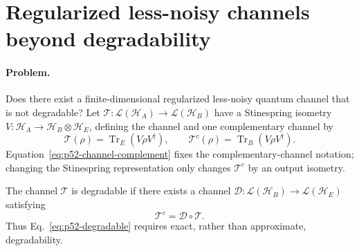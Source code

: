 \section{Regularized less-noisy channels beyond degradability}
\label{sec:problem-52}

\paragraph{Problem.}
Does there exist a finite-dimensional regularized less-noisy quantum channel
that is not degradable?  Let
$\mathcal T:\mathcal L(\mathcal H_A)\to\mathcal L(\mathcal H_B)$ have a
Stinespring isometry
$V:\mathcal H_A\to\mathcal H_B\otimes\mathcal H_E$, defining the channel and
one complementary channel by
\begin{equation}
  \mathcal T(\rho)=\operatorname{Tr}_E(V\rho V^\dagger),
  \qquad
  \mathcal T^c(\rho)=\operatorname{Tr}_B(V\rho V^\dagger).
  \label{eq:p52-channel-complement}
\end{equation}
Equation~\eqref{eq:p52-channel-complement} fixes the complementary-channel
notation; changing the Stinespring representation only changes
$\mathcal T^c$ by an output isometry.

The channel $\mathcal T$ is degradable if there exists a channel
$\mathcal D:\mathcal L(\mathcal H_B)\to\mathcal L(\mathcal H_E)$ satisfying
\begin{equation}
  \mathcal T^c=\mathcal D\circ\mathcal T.
  \label{eq:p52-degradable}
\end{equation}
Thus Eq.~\eqref{eq:p52-degradable} requires exact, rather than approximate,
degradability.

